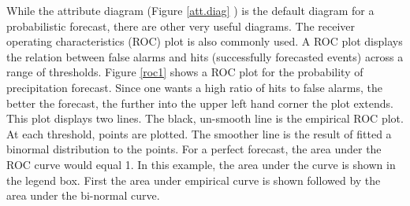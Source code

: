 \documentclass{article}
\begin{document}
While the  attribute diagram (Figure \ref{att.diag} ) is the default diagram
for a probabilistic forecast, there are other very useful diagrams.
The receiver operating characteristics (ROC) plot is also commonly
used.  A ROC plot displays the relation between false alarms and hits
(successfully forecasted events) across a range of thresholds. Figure
\ref{roc1}  shows a ROC plot for the probability of precipitation
forecast.  Since one wants a high ratio of hits to false alarms, the
better the forecast, the further into the upper left hand corner the
plot extends.  This plot displays two lines.  The black, un-smooth
line is the empirical ROC plot.  At each threshold, points are
plotted.  The smoother line is the result of fitted a binormal
distribution to the points.  For a perfect forecast, the area under
the ROC curve would equal 1.  In this example, the area under the
curve is shown in the legend box.  First the area under empirical
curve is shown followed by the area under the bi-normal curve. 
\end{document}
